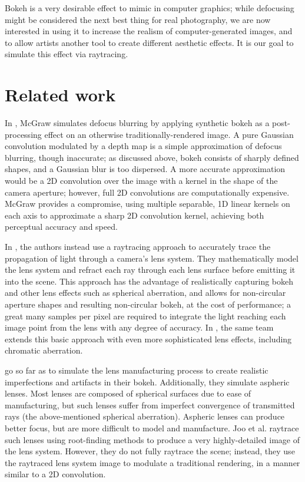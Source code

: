 \documentclass[twocolumn]{article}
\begin{document}
Bokeh is a very desirable effect to mimic in computer graphics; while defocusing
might be considered the next best thing for real photography, we are now
interested in using it to increase the realism of computer-generated images, and
to allow artists another tool to create different aesthetic effects. It is our
goal to simulate this effect via raytracing.

\section{Related work}
In \cite{McGraw2015}, McGraw simulates defocus blurring by applying synthetic
bokeh as a post-processing effect on an otherwise traditionally-rendered image.
A pure Gaussian convolution modulated by a depth map is a simple approximation
of defocus blurring, though inaccurate; as discussed above,
bokeh consists of sharply defined
shapes, and a Gaussian blur is too dispersed. A more accurate approximation
would be a 2D convolution over the image with a kernel in the shape of the
camera aperture; however, full 2D convolutions are computationally expensive.
McGraw provides a compromise, using multiple separable, 1D linear kernels on
each axis to approximate a sharp 2D convolution kernel, achieving both
perceptual accuracy and speed.

In \cite{Wu2010}, the authors instead use a raytracing approach to accurately
trace the propagation of light through a camera's lens system. They
mathematically model the lens system and refract each ray through each lens
surface before emitting it into the scene. This approach has the advantage of
realistically capturing bokeh and other lens effects such as spherical
aberration, and allows for non-circular aperture shapes and resulting
non-circular bokeh, at the cost of performance; a great many samples per pixel
are required to integrate the light reaching each image point from the lens with
any degree of accuracy. In \cite{Wu2013}, the same team extends this basic
approach with even more sophisticated lens effects, including chromatic aberration.

\cite{JooEtAl2016} go so far as to simulate the lens manufacturing process to
create realistic imperfections and artifacts in their bokeh. Additionally, they
simulate aspheric lenses. Most lenses are composed of spherical surfaces due
to ease of manufacturing, but such lenses suffer from imperfect convergence of
transmitted rays (the above-mentioned spherical aberration). Aspheric lenses can
produce better focus, but are more difficult to model and manufacture. Joo et
al. raytrace such lenses using root-finding methods to produce a very
highly-detailed image of the lens system. However, they do not fully raytrace
the scene; instead, they use the raytraced lens system image to modulate a
traditional rendering, in a manner similar to a 2D convolution.
\end{document}
